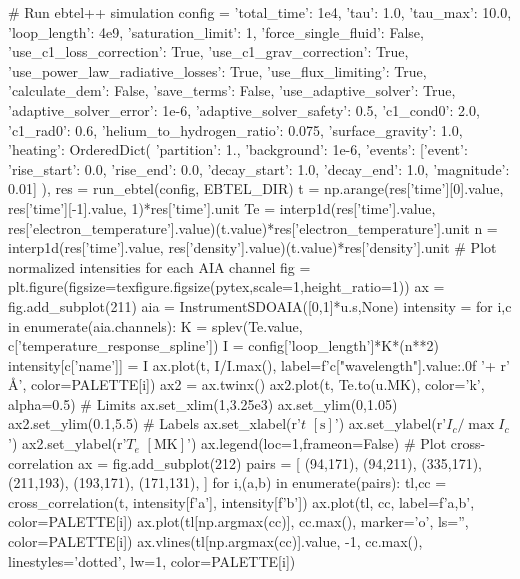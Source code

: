 \begin{pycode}
# Run ebtel++ simulation
config = {
    'total_time': 1e4,
    'tau': 1.0,
    'tau_max': 10.0,
    'loop_length': 4e9,
    'saturation_limit': 1,
    'force_single_fluid': False,
    'use_c1_loss_correction': True,
    'use_c1_grav_correction': True,
    'use_power_law_radiative_losses': True,
    'use_flux_limiting': True,
    'calculate_dem': False,
    'save_terms': False,
    'use_adaptive_solver': True,
    'adaptive_solver_error': 1e-6,
    'adaptive_solver_safety': 0.5,
    'c1_cond0': 2.0,
    'c1_rad0': 0.6,
    'helium_to_hydrogen_ratio': 0.075,
    'surface_gravity': 1.0,
    'heating': OrderedDict({
        'partition': 1.,
        'background': 1e-6,
        'events': [{'event': {'rise_start': 0.0,
                              'rise_end': 0.0,
                              'decay_start': 1.0,
                              'decay_end': 1.0, 
                              'magnitude': 0.01}}]
    }),
}
res = run_ebtel(config, EBTEL_DIR)
t = np.arange(res['time'][0].value, res['time'][-1].value, 1)*res['time'].unit
Te = interp1d(res['time'].value, res['electron_temperature'].value)(t.value)*res['electron_temperature'].unit
n = interp1d(res['time'].value, res['density'].value)(t.value)*res['density'].unit
# Plot normalized intensities for each AIA channel
fig = plt.figure(figsize=texfigure.figsize(pytex,scale=1,height_ratio=1))
ax = fig.add_subplot(211)
aia = InstrumentSDOAIA([0,1]*u.s,None)
intensity = {}
for i,c in enumerate(aia.channels):
    K = splev(Te.value, c['temperature_response_spline'])
    I = config['loop_length']*K*(n**2)
    intensity[c['name']] = I
    ax.plot(t, I/I.max(),
            label=f'{c["wavelength"].value:.0f} '+ r'$\si{\angstrom}$',
            color=PALETTE[i])
ax2 = ax.twinx()
ax2.plot(t, Te.to(u.MK), color='k', alpha=0.5)
# Limits
ax.set_xlim(1,3.25e3)
ax.set_ylim(0,1.05)
ax2.set_ylim(0.1,5.5)
# Labels
ax.set_xlabel(r'$t$ $[\si{\second}]$')
ax.set_ylabel(r'$I_c/\max{I_c}$')
ax2.set_ylabel(r'$T_e$ $[\si{\mega\kelvin}]$')
ax.legend(loc=1,frameon=False)
# Plot cross-correlation
ax = fig.add_subplot(212)
pairs = [
    (94,171),
    (94,211),
    (335,171),
    (211,193),
    (193,171),
    (171,131),
]
for i,(a,b) in enumerate(pairs):
    tl,cc = cross_correlation(t, intensity[f'{a}'], intensity[f'{b}'])
    ax.plot(tl, cc, label=f'{a},{b}', color=PALETTE[i])
    ax.plot(tl[np.argmax(cc)], cc.max(), marker='o', ls='', color=PALETTE[i])
    ax.vlines(tl[np.argmax(cc)].value, -1, cc.max(), linestyles='dotted', lw=1, color=PALETTE[i])

\end{pycode}
